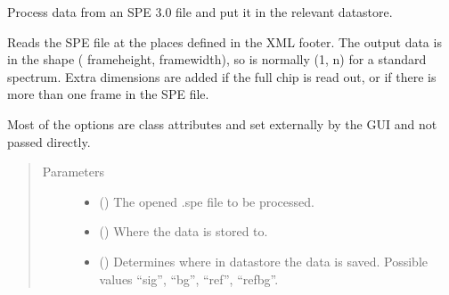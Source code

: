 \documentclass[a4paper,10pt,english]{sphinxmanual}
\begin{document}
\begin{fulllineitems}
\begin{fulllineitems}
\begin{quote}
\begin{description}
\begin{itemize}
\end{itemize}

\end{description}\end{quote}

\end{fulllineitems}


\begin{fulllineitems}
\label{\detokenize{sfgtools:sfgtools.SFGProcessTools.process_spe3x}}
\sphinxAtStartPar
Process data from an SPE 3.0 file and put it in the relevant datastore.

\sphinxAtStartPar
Reads the SPE file at the places defined in the XML footer. The output data is in the shape (
frameheight, framewidth), so is normally (1, n) for a standard spectrum. Extra dimensions are added
if the full chip is read out, or if there is more than one frame in the SPE file.

\sphinxAtStartPar
Most of the options are class attributes and set externally by the GUI and not passed directly.

\sphinxAtStartPar
{}
\begin{quote}\begin{description}
\item[{Parameters}] \leavevmode\begin{itemize}
\item {} 
\sphinxAtStartPar
{} () \textendash{} The opened .spe file to be processed.

\item {} 
\sphinxAtStartPar
{} () \textendash{} Where the data is stored to.

\item {} 
\sphinxAtStartPar
{} () \textendash{} Determines where in datastore the data is saved. Possible values “sig”, “bg”, “ref”, “refbg”.


\end{itemize}
\end{description}
\end{quote}
\end{fulllineitems}
\end{fulllineitems}
\end{document}
